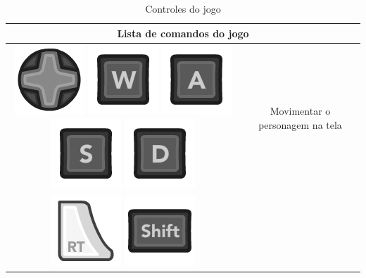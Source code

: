 \documentclass{article}
\begin{document}
\newpage
\begin{longtable}{|c|c|}
\caption{Controles do jogo}
\\
\hline
\multicolumn{2}{|c|}{Lista de comandos do jogo}
\\
\hline
\includegraphics[scale=0.3]{images/360_Dpad.png}
\includegraphics[scale=0.3]{images/kW.png} 
\includegraphics[scale=0.3]{images/kA.png}
\includegraphics[scale=0.3]{images/kS.png}
\includegraphics[scale=0.3]{images/kD.png}
& Movimentar o personagem na tela
\\
\hline
\includegraphics[scale=0.3]{images/360_RT.png}
\includegraphics[scale=0.3]{images/kShift.png}

\end{longtable}
\end{document}
